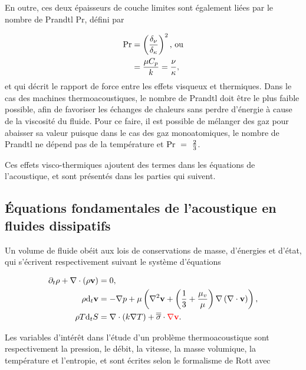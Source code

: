 En outre, ces deux épaisseurs de couche limites sont également liées par le nombre de Prandtl $\mathrm{Pr}$, défini par

\begin{subequations}
	\begin{align}
		\mathrm{Pr} &= \left(\frac{\delta_{\nu}}{\delta_{\kappa}}\right)^2 \text{, ou} \label{eq:Prandtl_delta}\\
				&= \frac{\mu C_{p}}{k} = \frac{\nu}{\kappa}, \label{eq:Prandtl_MuK_NuKappa}
	\end{align}
	\label{eq:Prandtl}%
\end{subequations}
et qui décrit le rapport de force entre les effets visqueux et thermiques. Dans le cas des machines thermoacoustiques, le nombre de Prandtl doit être le plus faible possible, afin de favoriser les échanges de chaleurs sans perdre d'énergie à cause de la viscosité du fluide. Pour ce faire, il est possible de mélanger des gaz pour abaisser sa valeur \cite{belcher_working_1999} puisque dans le cas des gaz monoatomiques, le nombre de Prandtl ne dépend pas de la température et $\mathrm{Pr}~=~\frac{2}{3}$.

Ces effets visco-thermiques ajoutent des termes dans les équations de l'acoustique, et sont présentés dans les parties qui suivent.

\subsection{\'Equations fondamentales de l'acoustique en fluides dissipatifs}

Un volume de fluide obéit aux lois de conservations de masse, d'énergies et d'état, qui s'écrivent respectivement suivant le système d'équations

\begin{subequations}
	\begin{align}
		\partial_t \rho + \nabla \cdot (\rho \mathbf v) &= 0, \label{eq:ConservMass}\\
		\rho \mathrm{d}_t \mathbf v &= -\nabla p + \mu\left( \nabla^2 \mathbf v +\left(\frac13+\frac{\mu_v}{\mu} \right)\nabla\left(\nabla \cdot \mathbf v\right)\right), \label{eq:NavierStokes_QteMvt_base}\\
		\rho T\mathrm{d}_t S &= \nabla\cdot (k \nabla T) + \overline{\overline{\sigma}}\cdot \textcolor{red}{\nabla \mathbf v}. \label{eq:ConservEnergie}
	\end{align}
\end{subequations}

Les variables d'intérêt dans l'étude d'un problème thermoacoustique sont respectivement la pression, le débit, la vitesse, la masse volumique, la température et l'entropie, et sont écrites selon le formalisme de Rott avec

